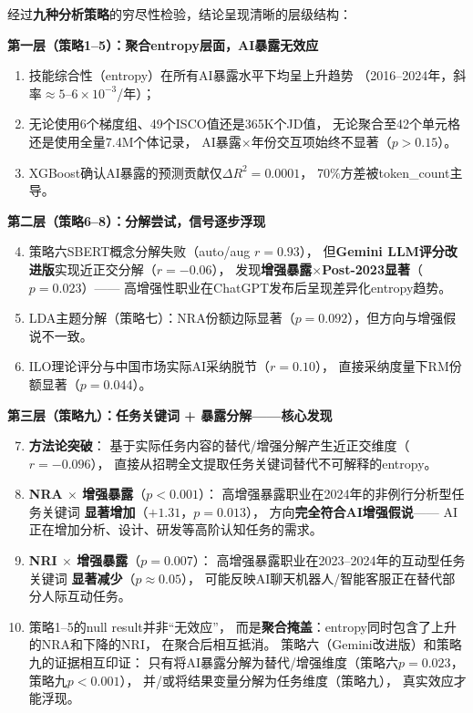 \documentclass[12pt,a4paper]{ctexart}
\begin{document}
\begin{resultbox}[最终结论]
经过\textbf{九种分析策略}的穷尽性检验，结论呈现清晰的层级结构：

\textbf{第一层（策略1--5）：聚合entropy层面，AI暴露无效应}

\begin{enumerate}
\item 技能综合性（entropy）在所有AI暴露水平下均呈上升趋势
      （2016--2024年，斜率$\approx 5$--$6 \times 10^{-3}$/年）；
\item 无论使用6个梯度组、49个ISCO值还是365K个JD值，
      无论聚合至42个单元格还是使用全量7.4M个体记录，
      AI暴露$\times$年份交互项始终不显著（$p>0.15$）。
\item XGBoost确认AI暴露的预测贡献仅$\Delta R^2 = 0.0001$，
      70\%方差被token\_count主导。
\end{enumerate}

\textbf{第二层（策略6--8）：分解尝试，信号逐步浮现}

\begin{enumerate}\setcounter{enumi}{3}
\item 策略六SBERT概念分解失败（auto/aug $r=0.93$），
      但\textbf{Gemini LLM评分改进版}实现近正交分解（$r=-0.06$），
      发现\textbf{增强暴露$\times$Post-2023显著}（$p=0.023$）——
      高增强性职业在ChatGPT发布后呈现差异化entropy趋势。
\item LDA主题分解（策略七）：NRA份额边际显著（$p=0.092$），但方向与增强假说不一致。
\item ILO理论评分与中国市场实际AI采纳脱节（$r=0.10$），
      直接采纳度量下RM份额显著（$p=0.044$）。
\end{enumerate}

\textbf{第三层（策略九）：任务关键词 + 暴露分解——核心发现}

\begin{enumerate}\setcounter{enumi}{6}
\item \textbf{方法论突破}：
      基于实际任务内容的替代/增强分解产生近正交维度（$r=-0.096$），
      直接从招聘全文提取任务关键词替代不可解释的entropy。

\item \textbf{NRA $\times$ 增强暴露}（$p<0.001$）：
      高增强暴露职业在2024年的非例行分析型任务关键词
      \textbf{显著增加}（$+1.31$，$p=0.013$），
      方向\textbf{完全符合AI增强假说}——
      AI正在增加分析、设计、研发等高阶认知任务的需求。

\item \textbf{NRI $\times$ 增强暴露}（$p=0.007$）：
      高增强暴露职业在2023--2024年的互动型任务关键词
      \textbf{显著减少}（$p\approx 0.05$），
      可能反映AI聊天机器人/智能客服正在替代部分人际互动任务。

\item 策略1--5的null result并非``无效应''，
      而是\textbf{聚合掩盖}：entropy同时包含了上升的NRA和下降的NRI，
      在聚合后相互抵消。
      策略六（Gemini改进版）和策略九的证据相互印证：
      只有将AI暴露分解为替代/增强维度（策略六$p=0.023$，策略九$p<0.001$），
      并/或将结果变量分解为任务维度（策略九），
      真实效应才能浮现。
\end{enumerate}

\end{resultbox}
\end{document}

